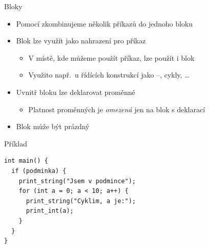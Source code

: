 \begin{frame}[fragile]{Bloky}

  \begin{itemize}
    \item Pomocí \code{\{ \}} zkombinujeme několik příkazů do jednoho bloku
    \item Blok lze využít jako nahrazení pro příkaz
    \begin{itemize}
      \item V místě, kde můžeme použít příkaz, lze použít i blok
      \item Využito např.\ u řídících konstrukcí jako --,
	cykly, \dots
    \end{itemize}

    \pause

    \item Uvnitř bloku lze deklarovat proměnné
    \begin{itemize}
      \item Platnost proměnných je \emph{omezená} jen na blok s deklarací
    \end{itemize}

    \pause

    \item Blok může být prázdný

  \end{itemize}


\begin{block}{Příklad}
\begin{lstlisting}
int main() {
  if (podminka) {
    print_string("Jsem v podmince");
    for (int a = 0; a < 10; a++) {
      print_string("Cyklim, a je:");
      print_int(a);
    }
  }
}
\end{lstlisting}
\end{block}

\end{frame}

